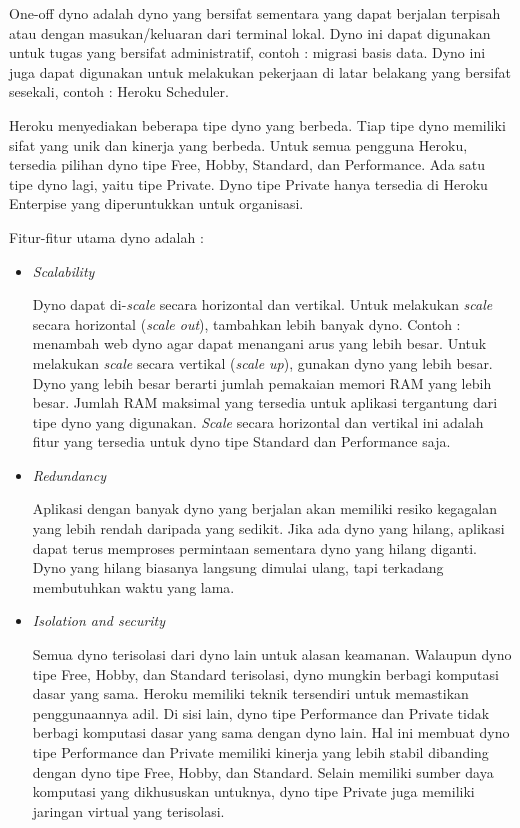 \documentclass[a4paper,twoside]{article}
\begin{document}
\begin{enumerate}
\begin{enumerate}
\begin{itemize}
\begin{itemize}
One-off dyno adalah dyno yang bersifat sementara yang dapat berjalan terpisah atau dengan masukan/keluaran dari terminal lokal. Dyno ini dapat digunakan untuk tugas yang bersifat administratif, contoh : migrasi basis data. Dyno ini juga dapat digunakan untuk melakukan pekerjaan di latar belakang yang bersifat sesekali, contoh : Heroku Scheduler.

\end{itemize}

Heroku menyediakan beberapa tipe dyno yang berbeda. Tiap tipe dyno memiliki sifat yang unik dan kinerja yang berbeda. Untuk semua pengguna Heroku, tersedia pilihan dyno tipe Free, Hobby, Standard, dan Performance. Ada satu tipe dyno lagi, yaitu tipe Private. Dyno tipe Private hanya tersedia di Heroku Enterpise yang diperuntukkan untuk organisasi.

Fitur-fitur utama dyno adalah :
\begin{itemize}
\item \textit{Scalability}

Dyno dapat di-\textit{scale} secara horizontal dan vertikal. Untuk melakukan \textit{scale} secara horizontal (\textit{scale out}), tambahkan lebih banyak dyno. Contoh : menambah web dyno agar dapat menangani arus yang lebih besar. Untuk melakukan \textit{scale} secara vertikal (\textit{scale up}), gunakan dyno yang lebih besar. Dyno yang lebih besar berarti jumlah pemakaian memori RAM yang lebih besar. Jumlah RAM maksimal yang tersedia untuk aplikasi tergantung dari tipe dyno yang digunakan. \textit{Scale} secara horizontal dan vertikal ini adalah fitur yang tersedia untuk dyno tipe Standard dan Performance saja.

\item \textit{Redundancy}

Aplikasi dengan banyak dyno yang berjalan akan memiliki resiko kegagalan yang lebih rendah daripada yang sedikit. Jika ada dyno yang hilang, aplikasi dapat terus memproses permintaan sementara dyno yang hilang diganti. Dyno yang hilang biasanya langsung dimulai ulang, tapi terkadang membutuhkan waktu yang lama.

\item \textit{Isolation and security}

Semua dyno terisolasi dari dyno lain untuk alasan keamanan. Walaupun dyno tipe Free, Hobby, dan Standard terisolasi, dyno mungkin berbagi komputasi dasar yang sama. Heroku memiliki teknik tersendiri untuk memastikan penggunaannya adil. Di sisi lain, dyno tipe Performance dan Private tidak berbagi komputasi dasar yang sama dengan dyno lain. Hal ini membuat dyno tipe Performance dan Private memiliki kinerja yang lebih stabil dibanding dengan dyno tipe Free, Hobby, dan Standard. Selain memiliki sumber daya komputasi yang dikhususkan untuknya, dyno tipe Private juga memiliki jaringan virtual yang terisolasi.


\end{itemize}
\end{itemize}
\end{enumerate}
\end{enumerate}
\end{document}
